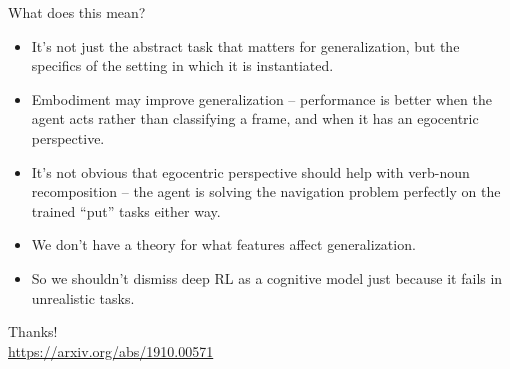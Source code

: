 \documentclass{beamer}
\begin{document}
\begin{frame}{What does this mean?}
\begin{itemize}
\item It's not just the abstract task that matters for generalization, but the specifics of the setting in which it is instantiated. 
\item Embodiment may improve generalization -- performance is better when the agent acts rather than classifying a frame, and when it has an egocentric perspective.
\item It's not obvious that egocentric perspective should help with verb-noun recomposition -- the agent is solving the navigation problem perfectly on the trained ``put'' tasks either way.
\item We don't have a theory for what features affect generalization.
\item So we shouldn't dismiss deep RL as a cognitive model just because it fails in unrealistic tasks. 
\end{itemize}
\end{frame}

\begin{frame}[standout]
Thanks!\\
\url{https://arxiv.org/abs/1910.00571}
\end{frame}
\end{document}
